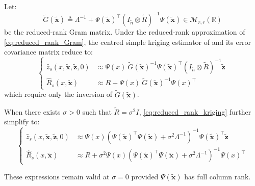\begin{proposition}\label{th:reduced_rank_kriging}
	Let:
	\begin{equation}
		\tilde{G}(\tilde{\mathbf{x}})\triangleq\Lambda^{-1}+\Psi(\tilde{\mathbf{x}})^\top\left(I_{\tilde{n}}\otimes\tilde{R}\right)^{-1}\Psi(\tilde{\mathbf{x}})\in\mathcal{M}_{r,r}(\mathbb{R})
	\end{equation}
	be the reduced-rank Gram matrix. Under the reduced-rank approximation of \eqref{eq:reduced_rank_Gram}, the centred simple kriging estimator of  and its error covariance matrix reduce to:
	\begin{equation}
		\left\{\begin{aligned}
		\hat{z}_s(x,\tilde{\mathbf{x}},\tilde{\mathbf{z}},0)&\approx\Psi(x)\:\tilde{G}(\tilde{\mathbf{x}})^{-1}\Psi(\tilde{\mathbf{x}})^\top\left(I_{\tilde{n}}\otimes\tilde{R}\right)^{-1}\tilde{\mathbf{z}}\\
		\hat{R}_s(x,\tilde{\mathbf{x}})&\approx R+\Psi(x)\:\tilde{G}(\tilde{\mathbf{x}})^{-1}\Psi(x)^\top
		\end{aligned}\right.\label{eq:reduced_rank_kriging}
	\end{equation}
	which require only the inversion of $\tilde{G}(\tilde{\mathbf{x}})$.

	When there exists $\sigma>0$ such that $\tilde{R}=\sigma^2I$, \eqref{eq:reduced_rank_kriging} further simplify to:
	\begin{equation}
		\left\{\begin{aligned}
		\hat{z}_s(x,\tilde{\mathbf{x}},\tilde{\mathbf{z}},0)&\approx\Psi(x)\left(\Psi(\tilde{\mathbf{x}})^\top\Psi(\tilde{\mathbf{x}})+\sigma^2\Lambda^{-1}\right)^{-1}\Psi(\tilde{\mathbf{x}})^\top\tilde{\mathbf{z}}\\
		\hat{R}_s(x,\tilde{\mathbf{x}})&\approx R+\sigma^2\Psi(x)\left(\Psi(\tilde{\mathbf{x}})^\top\Psi(\tilde{\mathbf{x}})+\sigma^2\Lambda^{-1}\right)^{-1}\Psi(x)^\top
		\end{aligned}\right.
	\end{equation}

	These expressions remain valid at $\sigma=0$ provided $\Psi(\tilde{\mathbf{x}})$ has full column rank.
\end{proposition}

